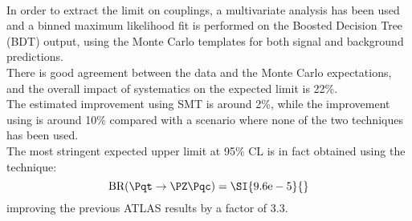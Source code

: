 \vspace{\baselineskip}
\\In order to extract the limit on \tZc couplings, a multivariate analysis has been used and a binned maximum likelihood fit is performed on the Boosted Decision Tree (BDT) output, using the Monte Carlo templates for both signal and background predictions.\\
There is good agreement between the data and the Monte Carlo expectations, 
and the overall impact of systematics on the expected limit is 22\%.\\
The estimated improvement using SMT is around 2\%, while the improvement using \DLrc is around 10\% compared with a scenario where none of the two techniques has been used.\\
The most stringent expected upper limit at 95\% CL is in fact obtained using the \DLrc technique:
\begin{equation*}
\mathrm{BR (\Pqt\rightarrow\PZ\Pqc)=\SI{9.6e-5}{}}
\end{equation*}
improving the previous ATLAS results by a factor of 3.3.
